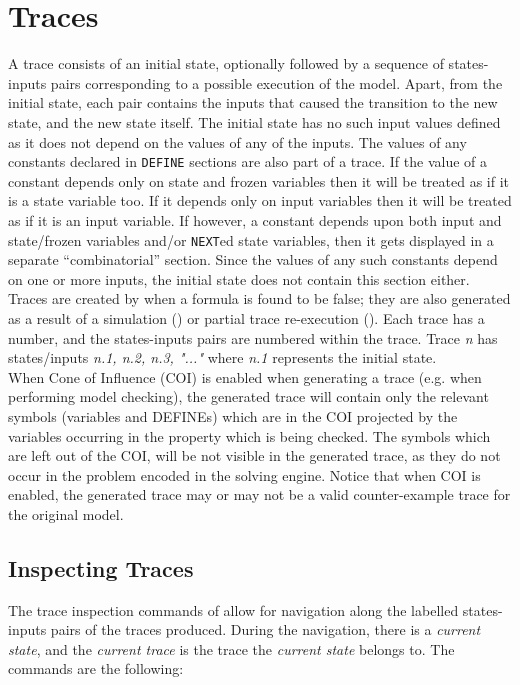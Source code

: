 \section{Traces}
\label{Traces}
%
A trace consists of an initial state, optionally followed by a
sequence of states-inputs pairs corresponding to a possible execution
of the model. Apart, from the initial state, each pair contains the
inputs that caused the transition to the new state, and the new state
itself. The initial state has no such input values defined as it does
not depend on the values of any of the inputs. The values of any
constants declared in \texttt{DEFINE} sections are also part of a
trace. If the value of a constant depends only on state and frozen
variables then it will be treated as if it is a state variable too. If
it depends only on input variables then it will be treated as if it is
an input variable. If however, a constant depends upon both input and
state/frozen variables and/or \texttt{NEXT}ed state variables, then it
gets displayed in a separate ``combinatorial'' section. Since the
values of any such constants depend on one or more inputs, the initial
state does not contain this section either.\\

Traces are created by \nusmv when a formula is found to be false; they
are also generated as a result of a simulation () or partial trace re-execution (). Each trace has a number, and the states-inputs pairs are
numbered within the trace.  Trace {\it n} has states/inputs {\it n.1,
  n.2, n.3, "..."} where \textit{n.1} represents the initial state.\\

When Cone of Influence (COI) is enabled when generating a trace
(e.g. when performing model checking), the generated trace will
contain only the relevant symbols (variables and DEFINEs) which are
in the COI projected by the variables occurring in the property
which is being checked. The symbols which are left out of the COI,
will be not visible in the generated trace, as they do not occur in
the problem encoded in the solving engine. Notice that when COI is
enabled, the generated trace may or may not be a valid
counter-example trace for the original model.

\subsection{Inspecting Traces}
\label{Inspecting Traces}
%
The trace inspection commands of \nusmv allow for navigation along the
labelled states-inputs pairs of the traces produced. During the
navigation, there is a {\it current state}, and the {\it current
trace} is the trace the {\it current state} belongs to. The commands
are the following:

